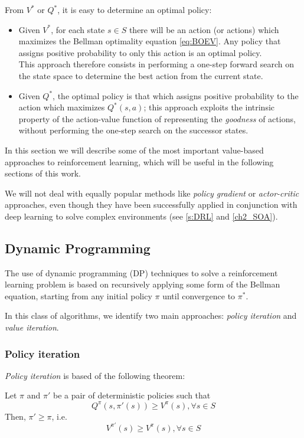From $V^*$ or $Q^*$, it is easy to determine an optimal policy:
\begin{itemize}
    \item Given $V^*$, for each state $s \in S$ there will be an action (or 
    actions) which maximizes the Bellman optimality equation \eqref{eq:BOEV}. 
    Any policy that assigns positive probability to only this action is an 
    optimal policy. \\
    This approach therefore consists in performing a one-step forward search on 
    the state space to determine the best action from the current state.
    \item Given $Q^*$, the optimal policy is that which assigns positive 
    probability to the action which maximizes $Q^*(s, a)$; this approach 
    exploits the intrinsic property of the action-value function of representing 
    the \textit{goodness} of actions, without performing the one-step search 
    on the successor states. 
\end{itemize}

In this section we will describe some of the most important value-based 
approaches to reinforcement learning, which will be useful in the following 
sections of this work. 

We will not deal with equally popular methods like \textit{policy gradient} or 
\textit{actor-critic} approaches, even though they have been successfully applied
in conjunction with deep learning to solve complex environments (see \ref{s:DRL}
and \ref{ch2_SOA}).

\subsection{Dynamic Programming}
The use of dynamic programming (DP) techniques to solve a reinforcement learning 
problem is based on recursively applying some form of the Bellman equation, 
starting from any initial policy $\pi$ until convergence to $\pi^*$.

In this class of algorithms, we identify two main approaches: \textit{policy 
iteration} and \textit{value iteration}.

\subsubsection{Policy iteration}
\textit{Policy iteration} is based of the following theorem:
\begin{theorem} \label{th:pol_imp}
    Let $\pi$ and $\pi'$ be a pair of deterministic policies such that
    \[
        Q^\pi(s, \pi'(s)) \ge V^\pi(s), \forall s \in S 
    \]
    Then, $\pi' \ge \pi$, i.e. 
    \[
        V^{\pi'}(s) \ge V^{\pi}(s), \forall s \in S
    \]
\end{theorem}

